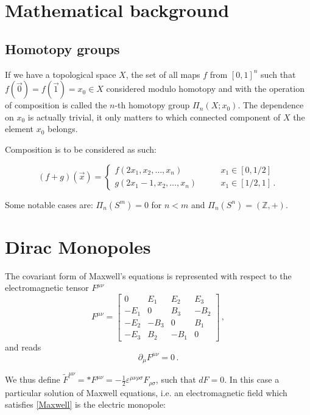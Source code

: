 \documentclass[main.tex]{subfiles}
\begin{document}
\section{Mathematical background}

\subsection{Homotopy groups}

If we have a topological space \(X\), the set of all maps \(f\) from \([0,1]^n\) such that  \(f(\vec{0}) = f(\vec{1} )=x_0 \in X\) considered modulo homotopy and with the operation of composition is called the \(n\)-th homotopy group \(\Pi_n (X; x_0)\). The dependence on \(x_0\) is actually trivial, it only matters to which connected component of \(X\) the element \(x_0\) belongs.

Composition is to be considered as such:

\begin{equation}
  (f+g) (\vec{x} ) = \begin{cases}
  f(2x_1, x_2, \dots, x_n) \qquad & x_1 \in [0, 1/2 ] \\
  g(2x_1-1, x_2, \dots, x_n) \qquad & x_1 \in [1/2, 1] \,.
  \end{cases}
\end{equation}

Some notable cases are: \(\Pi_n (S^m) = 0 \) for \(n<m\) and \(\Pi_n (S^n) = (\mathbb Z, +)\).

\section{Dirac Monopoles}
The covariant form of Maxwell's equations is represented with respect to  the electromagnetic tensor $F^{\mu \nu}$
%
\begin{equation}
  F^{\mu\nu} = \begin{bmatrix}
  0   & E_1  & E_2  & E_3 \\
  -E_1   & 0  & B_3  & -B_2 \\
  -E_2   & -B_3  & 0  & B_1 \\
  -E_3   & B_2  & -B_1  & 0
  \end{bmatrix}\,,
\end{equation}
%
and reads
\begin{equation}\label{Maxwell}
\partial_{\mu}F^{\mu \nu}=0\,.
\end{equation}

We thus define
$\tilde{F}^{\mu\nu}=*F^{\mu\nu}=-\frac{1}{2}\varepsilon^{\mu \nu \rho \sigma}F_{\rho \sigma}$,
such that $dF=0$.
In this case a particular solution of Maxwell equations, i.e. an electromagnetic field which satisfies \eqref{Maxwell} is the electric monopole:
\end{document}
